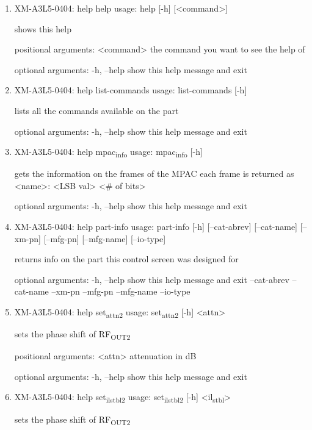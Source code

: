 \documentclass[11pt]{article}
\begin{document}
\begin{enumerate}
\item XM-A3L5-0404: help help
\label{sec:org34bae4b}
usage: help [-h] [<command>]

shows this help

positional arguments:
  <command>   the command you want to see the help of

optional arguments:
  -h, --help  show this help message and exit

\item XM-A3L5-0404: help list-commands
\label{sec:org7002dba}
usage: list-commands [-h]

lists all the commands available on the part

optional arguments:
  -h, --help  show this help message and exit

\item XM-A3L5-0404: help mpac\textsubscript{info}
\label{sec:orga31c858}
usage: mpac\textsubscript{info} [-h]

gets the information on the frames of the MPAC each frame is returned as
<name>: <LSB val> <\# of bits>

optional arguments:
  -h, --help  show this help message and exit

\item XM-A3L5-0404: help part-info
\label{sec:org2147556}
usage: part-info  [-h] [--cat-abrev] [--cat-name] [--xm-pn] [--mfg-pn] [--mfg-name]
        [--io-type]

returns info on the part this control screen was designed for

optional arguments:
  -h, --help   show this help message and exit
  --cat-abrev
  --cat-name
  --xm-pn
  --mfg-pn
  --mfg-name
  --io-type

\item XM-A3L5-0404: help set\textsubscript{attn}\textsubscript{2}
\label{sec:orgaa76dd6}
usage: set\textsubscript{attn}\textsubscript{2} [-h] <attn>

sets the phase shift of RF\textsubscript{OUT2}

positional arguments:
  <attn>      attenuation in dB

optional arguments:
  -h, --help  show this help message and exit

\item XM-A3L5-0404: help set\textsubscript{il}\textsubscript{stbl}\textsubscript{2}
\label{sec:org508e47e}
usage: set\textsubscript{il}\textsubscript{stbl}\textsubscript{2} [-h] <il\textsubscript{stbl}>

sets the phase shift of RF\textsubscript{OUT2}


\end{enumerate}
\end{document}
